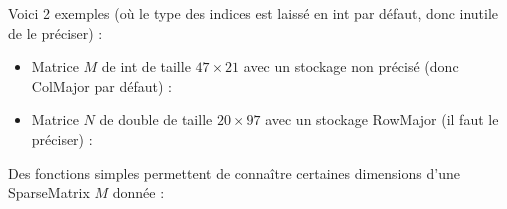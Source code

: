 \documentclass[11pt]{article}
\begin{document}
\vspace{5 mm}

\noindent
Voici 2 exemples (où le type des indices est laissé en int par défaut, donc inutile de le préciser) :
	
\vspace{1 mm}	
	
\begin{itemize}

	\item Matrice $M$ de int de taille $47 \times 21$ avec un stockage non précisé (donc ColMajor par défaut) :
	
\vspace{5 mm}	
	
\begin{center}
\end{center}
	
\vspace{5 mm}	

	\item Matrice $N$ de double de taille $20 \times 97$ avec un stockage RowMajor (il faut le préciser) :
	
\vspace{5 mm}	
	
\begin{center}
\end{center}

\end{itemize}

\vspace{5 mm}

\noindent
Des fonctions simples permettent de connaître certaines dimensions d'une SparseMatrix $M$ donnée :
	
\vspace{1 mm}	
	
\end{document}
